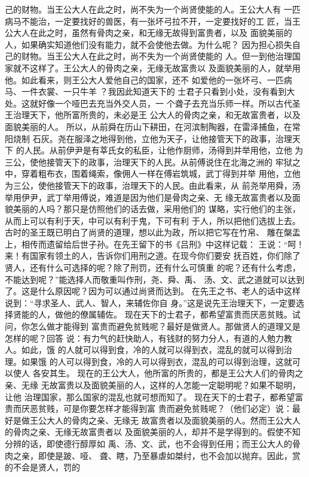 \documentclass[12pt,UTF8]{ctexbook}
\begin{document}
己的财物。当王公大人在此之时，尚不失为一个尚贤使能的人。王公大人有 
一匹病马不能治，一定要找好的兽医，有一张坏弓拉不开，一定要找好的工 
匠，当王公大人在此之时，虽然有骨肉之亲，和无缘无故得到富贵者，以及 
面貌美丽的人，如果确实知道他们没有能力，就不会使他去做。为什么呢？ 
因为担心损失自己的财物。当王公大人在此之时，尚不失为一个尚贤使能的 
人。但一到他治理国家就不这样了。王公大人的骨肉之亲，无缘无故富贵以 
及面貌美丽的人，就举用他。如此看来，则王公大人爱他自己的国家，还不 
如爱他的一张坏弓、一匹病马、一件衣裳、一只牛羊 ？我因此知道天下的 
士君子只看到小处，没有看到大处。这就好像一个哑巴去充当外交人员，一 
个聋子去充当乐师一样。所以古代圣王治理天下，他所富所贵的，未必是王 
公大人的骨肉之亲，和无故富贵者，以及面貌美丽的人。 
所以，从前舜在历山下耕田，在河滨制陶器，在雷泽捕鱼，在常阳烧制 
石灰。尧在服泽之地得到他，立他为天子，让他接管天下的政事，治理天下 
的人民。从前伊尹是有莘氏女的私臣，让他作厨师，汤得到并举用他，立他 
为三公，使他接管天下的政事，治理天下的人民。从前傅说住在北海之洲的 
牢狱之中，穿着粗布衣，围着绳索，像佣人一样在傅岩筑城，武丁得到并举 
用他，立他为三公，使他接管天下的政事，治理天下的人民。由此看来，从 
前尧举用舜，汤举用伊尹，武丁举用傅说，难道是因为他们是骨肉之亲、无 
缘无故富贵者以及面貌美丽的人吗？那只是仿照他们的话去做，采用他们的 
谋略，实行他们的主张，从而上可以有利于天，中可以有利于鬼，下可有利 
于人，所以把他们选拔上去。 
古时的圣王既已明白了尚贤的道理，想以此为政，所以把它写在竹帛、 
雕在槃盂上，相传而遗留给后世子孙。在先王留下的书《吕刑》中这样记载： 
王说：“呵！来！有国家有领土的人，告诉你们用刑之道。在现今你们要安 
抚百姓，你们除了贤人，还有什么可选择的呢？除了刑罚，还有什么可慎重 
的呢？还有什么考虑，不能达到呢？”能选择人而敬重叫作刑，尧、舜、禹、 
汤、文、武之道就可以达到了。这是什么原因呢？因为可以通过尚贤而达到。 
在先王之书、老人的话中这样说到：“寻求圣人、武人、智人，来辅佐你自 
身。”这是说先王治理天下，一定要选择贤能的人，做他的僚属辅佐。 
现在天下的士君子，都希望富贵而厌恶贫贱。试问，你怎么做才能得到 
富贵而避免贫贱呢？最好是做贤人。那做贤人的道理又是怎样的呢？回答 
说：有力气的赶快助人，有钱财的努力分人，有道的人勉力教人。如此，饿 
的人就可以得到食，冷的人就可以得到衣，混乱的就可以得到治理。如果饿 
的人可以得到食，冷的人可以得到衣，混乱的可以得到治理，这就可以使人 
各安其生。 
现在的王公大人，他所富的所贵的，都是王公大人们的骨肉之亲、无缘 
无故富贵以及面貌美丽的人，这样的人怎能一定聪明呢？如果不聪明，让他 
治理国家，那么国家的混乱也就可想而知了。 
现在天下的士君子，都希望富贵而厌恶贫贱，可是你要怎样才能得到富 
贵而避免贫贱呢？（他们必定）说：最好是做王公大人的骨肉之亲、无缘无 
故富贵者以及面貌美丽的人。然而王公大人的骨肉之亲、无缘无故富贵者以 
及面貌美丽的人，却并不是学得到的。假使不知分辨的话，即使德行醇厚如 
禹、汤、文、武，也不会得到任用；而王公大人的骨肉之亲，即使是跛、哑、 
聋、瞎，乃至暴虐如桀纣，也不会加以抛弃。因此，赏的不会是贤人，罚的 
\end{document}
